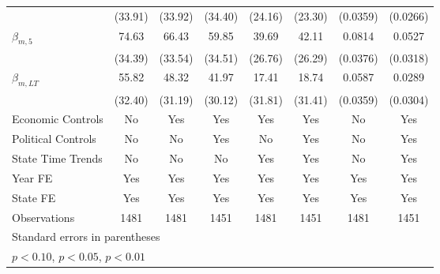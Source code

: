 {\begin{tabular}{l*{7}{c}}
                    &     (33.91)         &     (33.92)         &     (34.40)         &     (24.16)         &     (23.30)         &    (0.0359)         &    (0.0266)         \\
[1em]
$\beta_{m,5}$         &       74.63\sym{**} &       66.43\sym{*}  &       59.85\sym{*}  &       39.69         &       42.11         &      0.0814\sym{**} &      0.0527\sym{*}  \\
                    &     (34.39)         &     (33.54)         &     (34.51)         &     (26.76)         &     (26.29)         &    (0.0376)         &    (0.0318)         \\
[1em]
$\beta_{m,LT}$   &       55.82\sym{*}  &       48.32         &       41.97         &       17.41         &       18.74         &      0.0587         &      0.0289         \\
                    &     (32.40)         &     (31.19)         &     (30.12)         &     (31.81)         &     (31.41)         &    (0.0359)         &    (0.0304)         \\
[1em]
Economic Controls  &          No         &         Yes         &         Yes         &         Yes         &         Yes         &          No         &         Yes         \\
[1em]
Political Controls  &          No         &          No         &         Yes         &          No         &         Yes         &          No         &         Yes         \\
[1em]
State Time Trends   &          No         &          No         &          No         &         Yes         &         Yes         &          No         &         Yes         \\
[1em]
Year FE             &         Yes         &         Yes         &         Yes         &         Yes         &         Yes         &         Yes         &         Yes         \\
[1em]
State FE            &         Yes         &         Yes         &         Yes         &         Yes         &         Yes         &         Yes         &         Yes         \\
\hline
Observations        &        1481         &        1481         &        1451         &        1481         &        1451         &        1481         &        1451         \\
\hline\hline
\multicolumn{8}{l}{\footnotesize Standard errors in parentheses}\\
\multicolumn{8}{l}{\footnotesize \sym{*} \(p<0.10\), \sym{**} \(p<0.05\), \sym{***} \(p<0.01\)}\\
\end{tabular}
}
